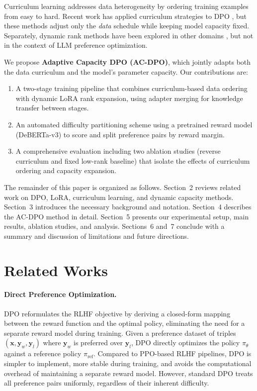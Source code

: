 \documentclass{article}
\begin{document}
Curriculum learning \citep{bengio2009curriculum} addresses data heterogeneity by ordering training examples from easy to hard. Recent work has applied curriculum strategies to DPO \citep{pattnaik2024currydpo}, but these methods adjust only the \emph{data} schedule while keeping model capacity fixed. Separately, dynamic rank methods have been explored in other domains \citep{deng2026drlora, croitoru2026curriculumdpo}, but not in the context of LLM preference optimization.

We propose \textbf{Adaptive Capacity DPO (AC-DPO)}, which jointly adapts both the data curriculum and the model's parameter capacity. Our contributions are:
\begin{enumerate}
    \item A two-stage training pipeline that combines curriculum-based data ordering with dynamic LoRA rank expansion, using adapter merging for knowledge transfer between stages.
    \item An automated difficulty partitioning scheme using a pretrained reward model (DeBERTa-v3) to score and split preference pairs by reward margin.
    \item A comprehensive evaluation including two ablation studies (reverse curriculum and fixed low-rank baseline) that isolate the effects of curriculum ordering and capacity expansion.
\end{enumerate}

The remainder of this paper is organized as follows. Section~2 reviews related work on DPO, LoRA, curriculum learning, and dynamic capacity methods. Section~3 introduces the necessary background and notation. Section~4 describes the AC-DPO method in detail. Section~5 presents our experimental setup, main results, ablation studies, and analysis. Sections~6 and~7 conclude with a summary and discussion of limitations and future directions.

\section{Related Works}

\paragraph{Direct Preference Optimization.}
DPO \citep{rafailov2023dpo} reformulates the RLHF objective by deriving a closed-form mapping between the reward function and the optimal policy, eliminating the need for a separate reward model during training. Given a preference dataset of triples $(\mathbf{x}, \mathbf{y}_w, \mathbf{y}_l)$ where $\mathbf{y}_w$ is preferred over $\mathbf{y}_l$, DPO directly optimizes the policy $\pi_\theta$ against a reference policy $\pi_{\text{ref}}$. Compared to PPO-based RLHF pipelines, DPO is simpler to implement, more stable during training, and avoids the computational overhead of maintaining a separate reward model. However, standard DPO treats all preference pairs uniformly, regardless of their inherent difficulty.
\end{document}
